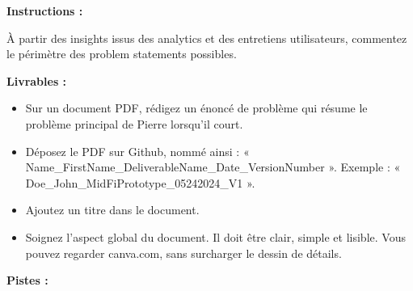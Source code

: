 \makeheaderfiles

\textbf{Instructions :}

À partir des insights issus des analytics et des entretiens utilisateurs, commentez le périmètre des problem statements possibles.

\textbf{Livrables :}

\begin{itemize}
\item Sur un document PDF, rédigez un énoncé de problème qui résume le problème principal de Pierre lorsqu'il court.
\item Déposez le PDF sur Github, nommé ainsi : « Name\_FirstName\_DeliverableName\_Date\_VersionNumber ». Exemple : « Doe\_John\_MidFiPrototype\_05242024\_V1 ».
\item Ajoutez un titre dans le document.
\item Soignez l'aspect global du document. Il doit être clair, simple et lisible. Vous pouvez regarder canva.com, sans surcharger le dessin de détails.
\end{itemize}

\textbf{Pistes :}

